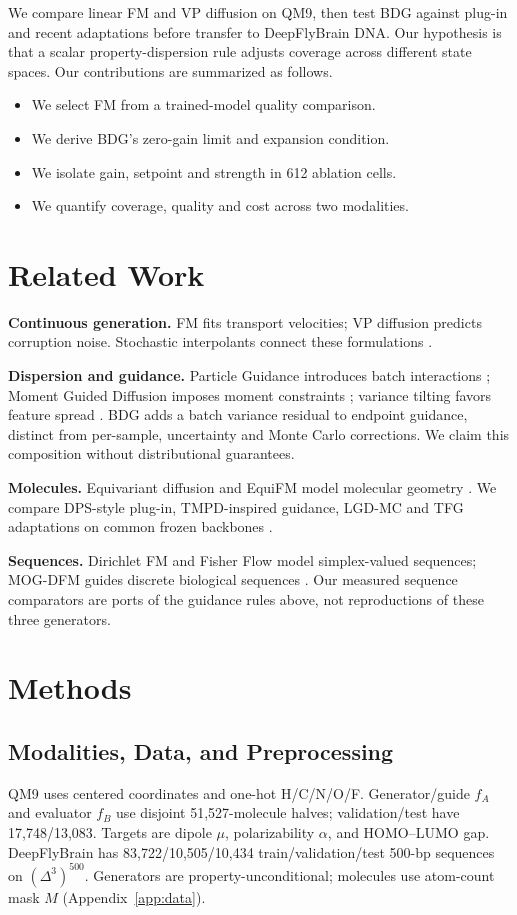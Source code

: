 \documentclass{article}
\begin{document}
We compare linear FM and VP diffusion on QM9, then test BDG against plug-in and recent adaptations before transfer to DeepFlyBrain DNA. Our hypothesis is that a scalar property-dispersion rule adjusts coverage across different state spaces. Our contributions are summarized as follows.
\begin{itemize}
\item We select FM from a trained-model quality comparison.
\item We derive BDG's zero-gain limit and expansion condition.
\item We isolate gain, setpoint and strength in 612 ablation cells.
\item We quantify coverage, quality and cost across two modalities.
\end{itemize}
\section{Related Work}
\textbf{Continuous generation.} FM fits transport velocities; VP diffusion predicts corruption noise. Stochastic interpolants connect these formulations \citep{lipman2022flow,albergo2025stochastic}.

\textbf{Dispersion and guidance.} Particle Guidance introduces batch interactions \citep{corso2024particle}; Moment Guided Diffusion imposes moment constraints \citep{mgd2026moment}; variance tilting favors feature spread \citep{vtd2026variance}. BDG adds a batch variance residual to endpoint guidance, distinct from per-sample, uncertainty and Monte Carlo corrections. We claim this composition without distributional guarantees.

\textbf{Molecules.} Equivariant diffusion and EquiFM model molecular geometry \citep{hoogeboom2022equivariant,song2023equifm}. We compare DPS-style plug-in, TMPD-inspired guidance, LGD-MC and TFG adaptations on common frozen backbones \citep{chung2023dps,boys2024tmpd,song2023lgd,ye2024tfg}.

\textbf{Sequences.} Dirichlet FM and Fisher Flow model simplex-valued sequences; MOG-DFM guides discrete biological sequences \citep{stark2024dirichlet,davis2024fisher,chen2025multi}. Our measured sequence comparators are ports of the guidance rules above, not reproductions of these three generators.

\section{Methods}
\subsection{Modalities, Data, and Preprocessing}\label{sec:data}
QM9 \citep{ramakrishnan2014qm9} uses centered coordinates and one-hot H/C/N/O/F. Generator/guide $f_A$ and evaluator $f_B$ use disjoint 51,527-molecule halves; validation/test have 17,748/13,083. Targets are dipole $\mu$, polarizability $\alpha$, and HOMO--LUMO gap. DeepFlyBrain has 83,722/10,505/10,434 train/validation/test 500-bp sequences on $(\Delta^3)^{500}$. Generators are property-unconditional; molecules use atom-count mask $M$ (Appendix~\ref{app:data}).
\end{document}
